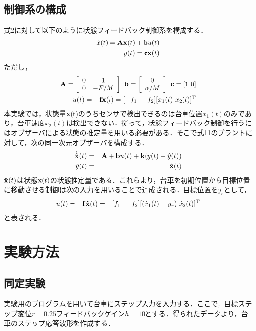 \documentclass[11pt,a4paper]{jsarticle}
\begin{document}
  \subsection{制御系の構成}
  式2に対して以下のように状態フィードバック制御系を構成する．
  \begin{eqnarray}
   \dot x(t) = {\bf Ax} (t) + {\bf b} u(t) \\
   y(t) = {\bf cx}(t)
  \end{eqnarray}
  ただし，
  \begin{eqnarray}
  {\bf A} = \left[
	    \begin{array}{cc}
	     0 & 1 \\
	     0 & -F/M \\
	    \end{array}
	   \right] \ 
  {\bf b} = \left[
	    \begin{array}{c}
	     0 \\
	     \alpha /M \\
	    \end{array}
	   \right] \ 
  {\bf c} = [1 \ 0] \\
   u(t) = - {\bf fx} (t) = [-f_1 \ -f_2][x_1(t) \ x_2(t)]^\mathrm{T}
  \end{eqnarray}
  本実験では，状態量{\bf x}(t)のうちセンサで検出できるのは台車位置$x_1(t)$のみであり，台車速度$x_2(t)$は検出できない．従って，状態フィードバック制御を行うにはオブザーバによる状態の推定量を用いる必要がある．そこで式11のプラントに対して，次の同一次元オブザーバを構成する．
  \begin{eqnarray}
   {\bf \dot{\hat{x}}}(t) &=& {\bf A} + {\bf b}u(t) + {\bf k}(y(t) - \hat y(t))\\
   \hat y(t) &=& {\bf \hat x}(t)
  \end{eqnarray}
  ${\bf \hat x}(t)$は状態${\bf x}(t)$の状態推定量である．これらより，台車を初期位置から目標位置に移動させる制御は次の入力を用いることで達成される．目標位置を$y_r$として，
  \begin{equation}
   u(t) = -{\bf f \hat x}(t) = -[f_1 \ -f_2][(\hat x_1(t) - y_r) \ \hat x_2(t)]^\mathrm{T}
  \end{equation}
  と表される．
 \section{実験方法}
  \subsection{同定実験}
  実験用のプログラムを用いて台車にステップ入力を入力する．ここで，目標ステップ変位$r=0.25$フィードバックゲイン$h = 10$とする．得られたデータより，台車のステップ応答波形を作成する．
 
\end{document}
